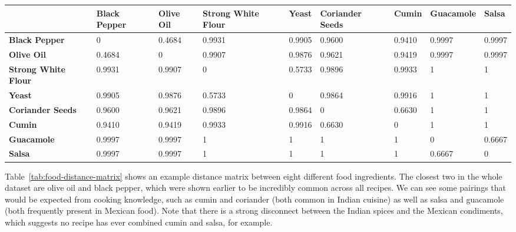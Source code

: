\documentclass[11pt,a4paper]{article}
\begin{document}
\begin{sidewaystable}
  \centering
  \begin{tabular}{| p{3.8cm} | p{1.5cm} | p{1.5cm} | p{1.5cm} | p{1.3cm} | p{1.9cm} | p{1.3cm} | p{2.1cm} | p{1.3cm} |}
    \hline
    & \textbf{Black Pepper} & \textbf{Olive Oil} & \textbf{Strong White Flour} & \textbf{Yeast}  & \textbf{Coriander Seeds} & \textbf{Cumin}  & \textbf{Guacamole} & \textbf{Salsa}  \\
    \hline
    \textbf{Black Pepper}       & 0            & 0.4684    & 0.9931             & 0.9905 & 0.9600          & 0.9410 & 0.9997    & 0.9997 \\
    \hline
    \textbf{Olive Oil}          & 0.4684       & 0         & 0.9907             & 0.9876 & 0.9621          & 0.9419 & 0.9997    & 0.9997 \\
    \hline
    \textbf{Strong White Flour} & 0.9931       & 0.9907    & 0                  & 0.5733 & 0.9896          & 0.9933 & 1         & 1      \\
    \hline
    \textbf{Yeast}              & 0.9905       & 0.9876    & 0.5733             & 0      & 0.9864          & 0.9916 & 1         & 1      \\
    \hline
    \textbf{Coriander Seeds}    & 0.9600       & 0.9621    & 0.9896             & 0.9864 & 0               & 0.6630 & 1         & 1      \\
    \hline
    \textbf{Cumin}              & 0.9410       & 0.9419    & 0.9933             & 0.9916 & 0.6630          & 0      & 1         & 1      \\
    \hline
    \textbf{Guacamole}          & 0.9997       & 0.9997    & 1                  & 1      & 1               & 1      & 0         & 0.6667 \\
    \hline
    \textbf{Salsa}              & 0.9997       & 0.9997    & 1                  & 1      & 1               & 1      & 0.6667    & 0      \\
    \hline
  \end{tabular}
  \caption{Distance matrix between eight ingredients}
  \label{tab:food-distance-matrix}
\end{sidewaystable}

Table~\ref{tab:food-distance-matrix} shows an example distance matrix between eight
different food ingredients. The closest two in the whole dataset are olive oil
and black pepper, which were shown earlier to be incredibly common across all recipes.
We can see some pairings that would be expected from cooking knowledge, such as
cumin and coriander (both common in Indian cuisine) as well as salsa and guacamole
(both frequently present in Mexican food). Note that there is a strong disconnect
between the Indian spices and the Mexican condiments, which suggests no recipe
has ever combined cumin and salsa, for example.
\end{document}
